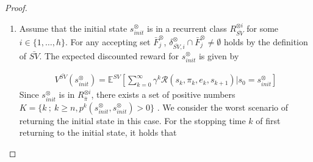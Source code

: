\documentclass[10pt]{article}
\theoremstyle{definition}
\begin{document}
\begin{proof}
  \begin{enumerate}
    \vspace{2mm}
    \item Assume that the initial state $s^{\otimes}_{init}$ is in a recurrent class $R^{\otimes i}_{\bar{SV}}$ for some $ i \in \{ 1,\ldots,h \} $.
    For any accepting set $\bar{F}^{\otimes}_j$, $\delta^{\otimes}_{\bar{SV},i} \cap \bar{F}^{\otimes}_j \neq \emptyset$ holds by the definition of $\bar{SV}$. The expected discounted reward for $s^{\otimes}_{init}$ is given by

  \begin{align}
    V^{\bar{SV}}(s^{\otimes}_{init}) = \mathbb{E}^{SV}[ {\sum_{k=0}^{\infty}} \gamma^k \mathcal{R}(s_k, \pi_k, e_k, s_{k+1}) | s_0 = s^{\otimes}_{init} ]
  \end{align}
    Since $s^{\otimes}_{init}$ is in $R^{\otimes i}_{\bar{\pi}}$, there exists a set of positive numbers $K = \{ k\ ;\ k \geq n, p^{k}(s^{\otimes}_{init}, s^{\otimes}_{init}) > 0 \}$ \cite{ESS}. We consider the worst scenario of returning the initial state in this case. For the stopping time $k$ of first returning to the initial state, it holds that


\end{enumerate}
\end{proof}
\end{document}
